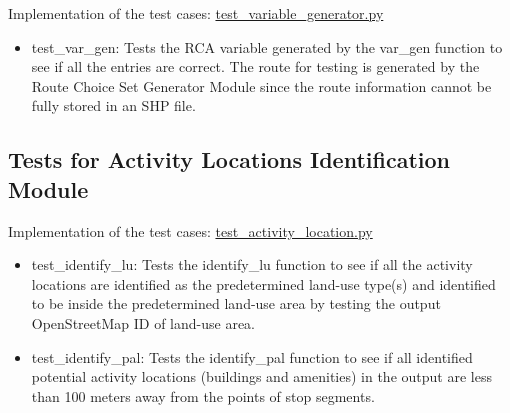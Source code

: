 \documentclass[12pt, titlepage]{article}
\begin{document}
Implementation of the test cases: \href{https://github.com/paezha/PyERT-BLACK/blob/rev1-implementation/test/test_variable_generator.py}{test\_variable\_generator.py}
\begin{itemize}
    \item test\_var\_gen: Tests the RCA variable generated by the var\_gen function to see if all the entries are correct. The route for testing is generated by the Route Choice Set Generator Module since the route information cannot be fully stored in an SHP file.
\end{itemize}

\subsection{Tests for Activity Locations Identification Module}
Implementation of the test cases: \href{https://github.com/paezha/PyERT-BLACK/blob/rev1-implementation/test/test_activity_location.py}{test\_activity\_location.py}
\begin{itemize}
    \item test\_identify\_lu: Tests the identify\_lu function to see if all the activity locations are identified as the predetermined land-use type(s) and identified to be inside the predetermined land-use area by testing the output OpenStreetMap ID of land-use area.
    \item test\_identify\_pal: Tests the identify\_pal function to see if all identified potential activity locations (buildings and amenities) in the output are less than 100 meters away from the points of stop segments.
\end{itemize}
\end{document}
